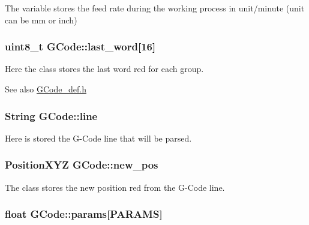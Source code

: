 The variable stores the feed rate during the working process in unit/minute (unit can be mm or inch) 

\hypertarget{class_g_code_a3674417ee3c5141c6655c05f6ffa0799}{
\subsubsection[{last\+\_\+word}]{\setlength{\rightskip}{0pt plus 5cm}uint8\+\_\+t G\+Code\+::last\+\_\+word\mbox{[}16\mbox{]}}}\label{class_g_code_a3674417ee3c5141c6655c05f6ffa0799}


Here the class stores the last word red for each group. 

\begin{DoxySeeAlso}{See also}
\hyperlink{_g_code__def_8h}{G\+Code\+\_\+def.\+h} 
\end{DoxySeeAlso}
\hypertarget{class_g_code_a20d7c90740e9e139b24f68336ad8c8f1}{
\subsubsection[{line}]{\setlength{\rightskip}{0pt plus 5cm}String G\+Code\+::line}}\label{class_g_code_a20d7c90740e9e139b24f68336ad8c8f1}


Here is stored the G-\/\+Code line that will be parsed. 

\hypertarget{class_g_code_aadec9af8923a5dc95f9f7da8bccfc109}{
\subsubsection[{new\+\_\+pos}]{\setlength{\rightskip}{0pt plus 5cm}Position\+X\+Y\+Z G\+Code\+::new\+\_\+pos}}\label{class_g_code_aadec9af8923a5dc95f9f7da8bccfc109}


The class stores the new position red from the G-\/\+Code line. 

\hypertarget{class_g_code_a6f38c9dddbd7c12c786c6363fd2a369c}{
\subsubsection[{params}]{\setlength{\rightskip}{0pt plus 5cm}float G\+Code\+::params\mbox{[}{\bf P\+A\+R\+A\+M\+S}\mbox{]}}}\label{class_g_code_a6f38c9dddbd7c12c786c6363fd2a369c}


